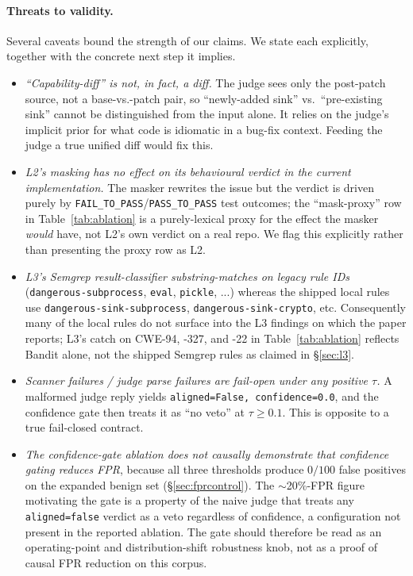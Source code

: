 \documentclass{article}
\begin{document}
\paragraph{Threats to validity.}
Several caveats bound the strength of our claims. We state each explicitly, together with the concrete next step it implies.
\begin{itemize}[nosep,leftmargin=1.4em]
\item \emph{``Capability-diff'' is not, in fact, a diff.} The judge sees only the post-patch source, not a base-vs.-patch pair, so ``newly-added sink'' vs.\ ``pre-existing sink'' cannot be distinguished from the input alone. It relies on the judge's implicit prior for what code is idiomatic in a bug-fix context. Feeding the judge a true unified diff would fix this.
\item \emph{L2's masking has no effect on its behavioural verdict in the current implementation.} The masker rewrites the issue but the verdict is driven purely by \texttt{FAIL\_TO\_PASS}/\texttt{PASS\_TO\_PASS} test outcomes; the ``mask-proxy'' row in Table~\ref{tab:ablation} is a purely-lexical proxy for the effect the masker \emph{would} have, not L2's own verdict on a real repo. We flag this explicitly rather than presenting the proxy row as L2.
\item \emph{L3's Semgrep result-classifier substring-matches on legacy rule IDs} (\texttt{dangerous-subprocess}, \texttt{eval}, \texttt{pickle}, ...) whereas the shipped local rules use \texttt{dangerous-sink-subprocess}, \texttt{dangerous-sink-crypto}, etc. Consequently many of the local rules do not surface into the L3 findings on which the paper reports; L3's catch on CWE-94, -327, and -22 in Table~\ref{tab:ablation} reflects Bandit alone, not the shipped Semgrep rules as claimed in \S\ref{sec:l3}.
\item \emph{Scanner failures / judge parse failures are fail-open under any positive $\tau$.} A malformed judge reply yields \texttt{aligned=False, confidence=0.0}, and the confidence gate then treats it as ``no veto'' at $\tau\geq 0.1$. This is opposite to a true fail-closed contract.
\item \emph{The confidence-gate ablation does not causally demonstrate that confidence gating reduces FPR}, because all three thresholds produce $0/100$ false positives on the expanded benign set (\S\ref{sec:fprcontrol}). The $\sim$20\%-FPR figure motivating the gate is a property of the naive judge that treats any \texttt{aligned=false} verdict as a veto regardless of confidence, a configuration not present in the reported ablation. The gate should therefore be read as an operating-point and distribution-shift robustness knob, not as a proof of causal FPR reduction on this corpus.

\end{itemize}
\end{document}
